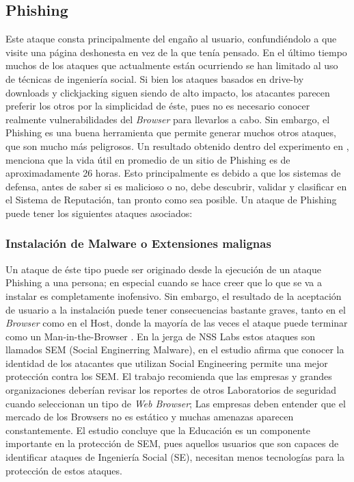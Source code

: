 \subsection{Phishing}
Este ataque consta principalmente del engaño al usuario, confundiéndolo a que visite una página deshonesta en vez de la que tenía pensado. En el último tiempo muchos de los ataques que actualmente están ocurriendo se han limitado al uso de técnicas de ingeniería social. Si bien los ataques basados en drive-by downloads y clickjacking siguen siendo de alto impacto, los atacantes parecen preferir los otros por la simplicidad de éste, pues no es necesario conocer realmente vulnerabilidades del \textit{Browser} para llevarlos a cabo. Sin embargo, el Phishing es una buena herramienta que permite generar muchos otros ataques, que son mucho más peligrosos. Un resultado obtenido dentro del experimento en \cite{browSecPhish}, menciona que la vida útil en promedio de un sitio de Phishing es de aproximadamente 26 horas. Esto principalmente es debido a que los sistemas de defensa, antes de saber si es malicioso o no, debe descubrir, validar y clasificar en el Sistema de Reputación, tan pronto como sea posible. Un ataque de Phishing puede tener los siguientes ataques asociados:

	\subsubsection{Instalación de Malware o Extensiones malignas}
	Un ataque de éste tipo puede ser originado desde la ejecución de un ataque Phishing a una persona; en especial cuando se hace creer que lo que se va a instalar es completamente inofensivo. Sin embargo, el resultado de la aceptación de usuario a la instalación puede tener consecuencias bastante graves, tanto en el \textit{Browser} como en el Host, donde la mayoría de las veces el ataque puede terminar como un Man-in-the-Browser \cite{Utakrit2009, Dougan2012}. En la jerga de NSS Labs estos ataques son llamados SEM (Social Enginerring Malware), en el estudio \cite{rowSecSEMBlock} afirma que conocer la identidad de los atacantes que utilizan Social Engineering permite una mejor protección contra los SEM. El trabajo recomienda que las empresas y grandes organizaciones deberían revisar los reportes de otros Laboratorios de seguridad cuando seleccionan un tipo de \textit{Web Browser}; Las empresas deben entender que el mercado de los Browsers no es estático y muchas amenazas aparecen constantemente. El estudio concluye que la Educación es un componente importante en la protección de SEM, pues aquellos usuarios que son capaces de identificar ataques de Ingeniería Social (SE), necesitan menos tecnologías para la protección de estos ataques.

